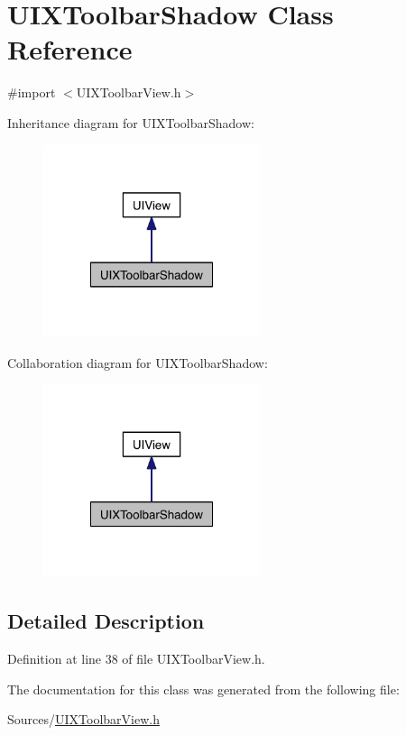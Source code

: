 \hypertarget{interface_u_i_x_toolbar_shadow}{\section{U\-I\-X\-Toolbar\-Shadow Class Reference}
\label{d9/d6a/interface_u_i_x_toolbar_shadow}
}


{\ttfamily \#import $<$U\-I\-X\-Toolbar\-View.\-h$>$}



Inheritance diagram for U\-I\-X\-Toolbar\-Shadow\-:
\nopagebreak
\begin{figure}[H]
\begin{center}
\leavevmode
\includegraphics[width=180pt]{d7/d18/interface_u_i_x_toolbar_shadow__inherit__graph}
\end{center}
\end{figure}


Collaboration diagram for U\-I\-X\-Toolbar\-Shadow\-:
\nopagebreak
\begin{figure}[H]
\begin{center}
\leavevmode
\includegraphics[width=180pt]{d2/de5/interface_u_i_x_toolbar_shadow__coll__graph}
\end{center}
\end{figure}


\subsection{Detailed Description}


Definition at line 38 of file U\-I\-X\-Toolbar\-View.\-h.



The documentation for this class was generated from the following file\-:\begin{DoxyCompactItemize}
\item 
Sources/\hyperlink{_u_i_x_toolbar_view_8h}{U\-I\-X\-Toolbar\-View.\-h}\end{DoxyCompactItemize}
